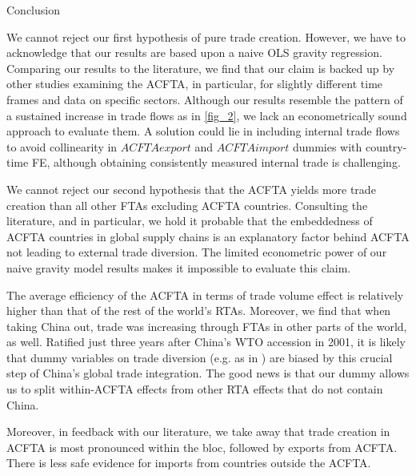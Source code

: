 \begin{section}{Conclusion}

We cannot reject our first hypothesis of pure trade creation. However, we have to acknowledge that our results are based upon a naive OLS gravity regression. Comparing our results to the literature, we find that our claim is backed up by other studies examining the ACFTA, in particular, for slightly different time frames and data on specific sectors. Although our results resemble the pattern of a sustained increase in trade flows as in \autoref{fig_2}, we lack an econometrically sound approach to evaluate them. A solution could lie in including internal trade flows to avoid collinearity in $ACFTAexport$ and $ACFTAimport$ dummies with country-time FE, although obtaining consistently measured internal trade is challenging.

We cannot reject our second hypothesis that the ACFTA yields more trade creation than all other FTAs excluding ACFTA countries. Consulting the literature, and \cite{wla_2021} in particular, we hold it probable that the embeddedness of ACFTA countries in global supply chains is an explanatory factor behind ACFTA not leading to external trade diversion. The limited econometric power of our naive gravity model results makes it impossible to evaluate this claim. 

The average efficiency of the ACFTA in terms of trade volume effect is relatively higher than that of the rest of the world's RTAs. Moreover, we find that when taking China out, trade was increasing through FTAs in other parts of the world, as well. Ratified just three years after China's WTO accession in 2001, it is likely that dummy variables on trade diversion (e.g. as in \cite{dyz_2014}) are biased by this crucial step of China's global trade integration. The good news is that our dummy allows us to split within-ACFTA effects from other RTA effects that do not contain China.

Moreover, in feedback with our literature, we take away that trade creation in ACFTA is most pronounced within the bloc, followed by exports from ACFTA. There is less safe evidence for imports from countries outside the ACFTA.

\end{section}
